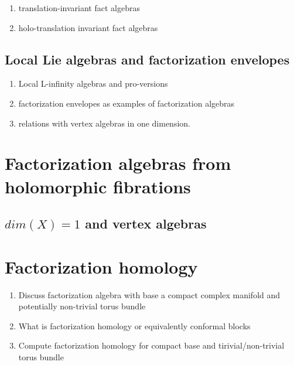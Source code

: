 \documentclass[12pt]{amsart}
\theoremstyle{definition}
\theoremstyle{remark}
\def\brian{\textcolor{blue}{BW: }\textcolor{blue}}
\begin{document}
\begin{enumerate}
\item {\color{red} translation-invariant fact algebras}
\item {\color{red} holo-translation invariant fact algebras}
\end{enumerate}

\subsection{Local Lie algebras and factorization envelopes}

\begin{enumerate}
\item Local L-infinity algebras and pro-versions
\item factorization envelopes as examples of factorization algebras
\item relations with vertex algebras in one dimension. 
\end{enumerate}

\section{Factorization algebras from holomorphic fibrations}
\subsection{$dim(X)=1$ and vertex algebras}

\section{Factorization homology}

{\color{red}
\begin{enumerate}
\item Discuss factorization algebra with base a compact complex manifold and potentially non-trivial torus bundle
\item What is factorization homology or equivalently conformal blocks
\item Compute factorization homology for compact base and tirivial/non-trivial torus bundle
\end{enumerate}
}


%  




\address{\tiny DEPARTMENT OF MATHEMATICS AND STATISTICS, BOSTON UNIVERSITY, 111 CUMMINGTON MALL, BOSTON} \\
\indent \footnotesize{}

\address{\tiny DEPARTMENT OF MATHEMATICS, NORTH\brian{WESTERN/EASTERN},...}
\indent \footnotesize{}
\end{document}
